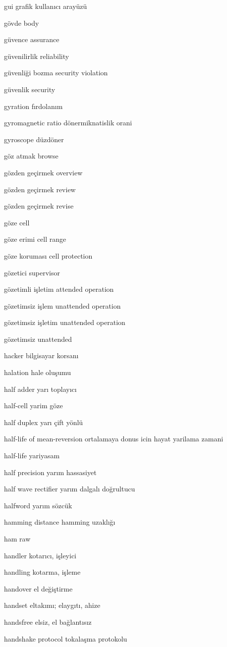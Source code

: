 \documentclass[12pt,fleqn]{article}\usepackage{../../common}
\begin{document}
gui grafik kullanıcı arayüzü

gövde body

güvence assurance

güvenilirlik reliability

güvenliği bozma security violation

güvenlik security

gyration fırdolanım

gyromagnetic ratio dönermiknatislik orani

gyroscope düzdöner

göz atmak browse

gözden geçirmek overview

gözden geçirmek review

gözden geçirmek revise

göze cell

göze erimi cell range

göze koruması cell protection

gözetici supervisor

gözetimli işletim attended operation

gözetimsiz işlem unattended operation

gözetimsiz işletim unattended operation

gözetimsiz unattended

hacker bilgisayar korsanı

halation hale oluşumu

half adder yarı toplayıcı

half-cell yarim göze

half duplex yarı çift yönlü

half-life of mean-reversion ortalamaya donus icin hayat yarilama zamani

half-life yariyasam

half precision yarım hassasiyet

half wave rectifier yarım dalgalı doğrultucu

halfword yarım sözcük

hamming distance hamming uzaklığı

ham raw

handler kotarıcı, işleyici

handling kotarma, işleme

handover el değiştirme

handset eltakımı; elaygıtı, ahize

handsfree elsiz, el bağlantısız

handshake protocol tokalaşma protokolu
\end{document}
